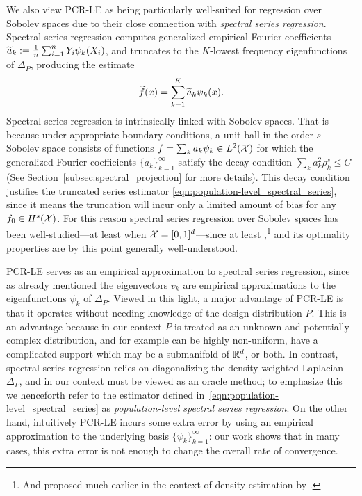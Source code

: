 We also view PCR-LE as being particularly well-suited for regression over Sobolev spaces due to their close connection with \emph{spectral series regression}. Spectral series regression computes generalized empirical Fourier coefficients $\widetilde{a}_k := \frac{1}{n}\sum_{i = 1}^{n} Y_i \psi_k(X_i)$, and truncates to the $K$-lowest frequency eigenfunctions of $\Delta_P$, producing the estimate
\begin{equation}
\label{eqn:population-level_spectral_series}
\widetilde{f}(x) = \sum_{k = 1}^{K} \widetilde{a}_k \psi_k(x).
\end{equation} 
Spectral series regression is intrinsically linked with Sobolev spaces. That is because under appropriate boundary conditions, a unit ball in the order-$s$ Sobolev space consists of functions $f = \sum_{k} a_k \psi_k \in L^2(\mathcal{X})$ for which the generalized Fourier coefficients $\{a_k\}_{k = 1}^{\infty}$ satisfy the decay condition $\sum_{k} a_k^2 \rho_k^s \leq C$ (See Section~\ref{subsec:spectral_projection} for more details). This decay condition justifies the truncated series estimator \eqref{eqn:population-level_spectral_series}, since it means the truncation will incur only a limited amount of bias for any $f_0 \in H^s(\mathcal{X})$. For this reason spectral series regression over Sobolev spaces has been well-studied---at least when $\mathcal{X} = [0,1]^d$---since at least \citet{rice1984},\footnote{And proposed much earlier in the context of density estimation by \citet{cencov1962}.} and its optimality properties are by this point generally well-understood.

PCR-LE serves as an empirical approximation to spectral series regression, since as already mentioned the eigenvectors $v_k$ are empirical approximations to the eigenfunctions $\psi_k$ of $\Delta_P$. Viewed in this light, a major advantage of PCR-LE is that it operates without needing knowledge of the design distribution $P$. This is an advantage because in our context $P$ is treated as an unknown and potentially complex distribution, and for example can be highly non-uniform, have a complicated support which may be a submanifold of $\mathbb{R}^d$, or both. In contrast, spectral series regression relies on diagonalizing the density-weighted Laplacian $\Delta_P$, and in our context must be viewed as an oracle method; to emphasize this we henceforth refer to the estimator defined in~\eqref{eqn:population-level_spectral_series} as \emph{population-level spectral series regression}. On the other hand, intuitively PCR-LE incurs some extra error by using an empirical approximation to the underlying basis $\{\psi_k\}_{k = 1}^{\infty}$: our work shows that in many cases, this extra error is not enough to change the overall rate of convergence.


